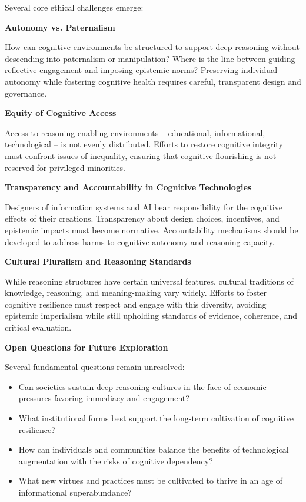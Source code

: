Several core ethical challenges emerge:

\textbf{Autonomy vs. Paternalism}

How can cognitive environments be structured to support deep reasoning
without descending into paternalism or manipulation? Where is the line
between guiding reflective engagement and imposing epistemic norms?
Preserving individual autonomy while fostering cognitive health requires
careful, transparent design and governance.

\textbf{Equity of Cognitive Access}

Access to reasoning-enabling environments -- educational, informational,
technological -- is not evenly distributed. Efforts to restore cognitive
integrity must confront issues of inequality, ensuring that cognitive
flourishing is not reserved for privileged minorities.

\textbf{Transparency and Accountability in Cognitive Technologies}

Designers of information systems and AI bear responsibility for the
cognitive effects of their creations. Transparency about design choices,
incentives, and epistemic impacts must become normative. Accountability
mechanisms should be developed to address harms to cognitive autonomy
and reasoning capacity.

\textbf{Cultural Pluralism and Reasoning Standards}

While reasoning structures have certain universal features, cultural
traditions of knowledge, reasoning, and meaning-making vary widely.
Efforts to foster cognitive resilience must respect and engage with this
diversity, avoiding epistemic imperialism while still upholding
standards of evidence, coherence, and critical evaluation.

\textbf{Open Questions for Future Exploration}

Several fundamental questions remain unresolved:

\begin{itemize}
	
	\item Can societies sustain deep reasoning cultures in the face 
	of economic pressures favoring immediacy and engagement?
	
	\item What institutional forms best support the long-term 
	cultivation of cognitive resilience?
	
	\item How can individuals and communities balance the benefits 
	of technological augmentation with the risks of cognitive 
	dependency?
	
	\item What new virtues and practices must be cultivated to 
	thrive in an age of informational superabundance?
\end{itemize}

